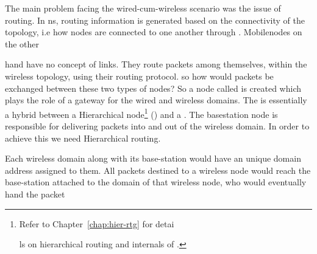 {The main problem facing the wired-cum-wireless scenario was the issue of routing. In ns, routing information is generated based on the connectivity of the topology, i.e how nodes are connected to one another through . Mobilenodes on the other 





















hand have no concept of links. They route packets among themselves, within the wireless topology, using their routing protocol. so how would packets be exchanged between these two types of nodes?
So a node called  is created which plays the role of a gateway for the wired and wireless domains. The  is essentially a hybrid between a Hierarchical node\footnote{Refer to Chapter~\ref{chap:hier-rtg} for detai





















ls on hierarchical routing and internals of .} () and a . The basestation node is responsible for delivering packets into and out of the wireless domain. In order to achieve this we need Hierarchical routing.





















 Each wireless domain along with its base-station would have an unique domain address assigned to them. All packets destined to a wireless node would reach the base-station attached to the domain of that wireless node, who would eventually hand the packet





















}
